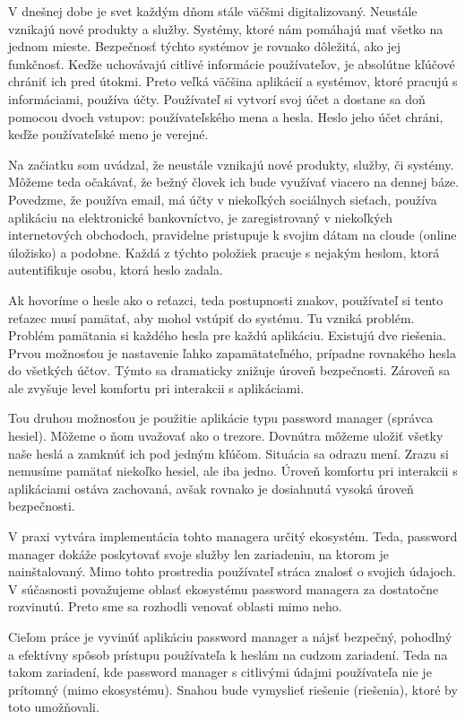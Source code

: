 \indent	V dnešnej dobe je svet každým dňom stále väčšmi digitalizovaný. Neustále vznikajú nové produkty a služby. Systémy, ktoré nám pomáhajú mať všetko na jednom mieste. Bezpečnosť týchto systémov je rovnako dôležitá, ako jej funkčnosť. Keďže uchovávajú citlivé informácie používateľov, je absolútne kľúčové chrániť ich pred útokmi. Preto veľká väčšina aplikácií a systémov, ktoré pracujú s informáciami, používa účty. Používateľ si vytvorí svoj účet a dostane sa doň pomocou dvoch vstupov: používateľského mena a hesla. Heslo jeho účet chráni, keďže používateľské meno je verejné.

Na začiatku som uvádzal, že neustále vznikajú nové produkty, služby, či systémy. Môžeme teda očakávať, že bežný človek ich bude využívať viacero na dennej báze. Povedzme, že používa email, má účty v niekoľkých sociálnych sieťach, používa aplikáciu na elektronické bankovníctvo, je zaregistrovaný v niekoľkých internetových obchodoch, pravidelne pristupuje k svojim dátam na cloude (online úložisko) a podobne. Každá z týchto položiek pracuje s nejakým heslom, ktorá autentifikuje osobu, ktorá heslo zadala.

Ak hovoríme o hesle ako o reťazci, teda postupnosti znakov, používateľ si tento reťazec musí pamätať, aby mohol vstúpiť do systému. Tu vzniká problém. Problém pamätania si každého hesla pre každú aplikáciu. Existujú dve riešenia. Prvou možnosťou je nastavenie ľahko zapamätateľného, prípadne rovnakého hesla do všetkých účtov. Týmto sa dramaticky znižuje úroveň bezpečnosti. Zároveň sa ale zvyšuje level komfortu pri interakcii s aplikáciami.

Tou druhou možnosťou je použitie aplikácie typu password manager (správca hesiel). Môžeme o ňom uvažovať ako o trezore. Dovnútra môžeme uložiť všetky naše heslá a zamknúť ich pod jedným kľúčom. Situácia sa odrazu mení. Zrazu si nemusíme pamätať niekoľko hesiel, ale iba jedno. Úroveň komfortu pri interakcii s aplikáciami ostáva zachovaná, avšak rovnako je dosiahnutá vysoká úroveň bezpečnosti.

V praxi vytvára implementácia tohto managera určitý ekosystém. Teda, password manager dokáže poskytovať svoje služby len zariadeniu, na ktorom je nainštalovaný. Mimo tohto prostredia používateľ stráca znalosť o svojich údajoch. V súčasnosti považujeme oblasť ekosystému password managera za dostatočne rozvinutú. Preto sme sa rozhodli venovať oblasti mimo neho.

Cieľom práce je vyvinúť aplikáciu password manager a nájsť bezpečný, pohodlný a efektívny spôsob prístupu používateľa k heslám na cudzom zariadení. Teda na takom zariadení, kde password manager s citlivými údajmi používateľa nie je prítomný (mimo ekosystému). Snahou bude vymyslieť riešenie (riešenia), ktoré by toto umožňovali.